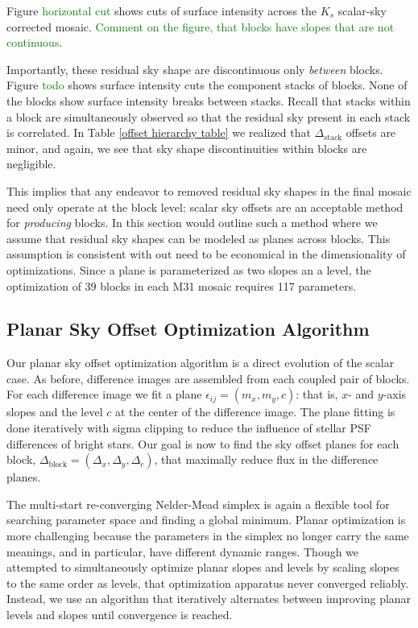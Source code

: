\documentclass[iop]{emulateapj}
\newcommand{\todo}[1]{\textcolor{green}{#1}}
\begin{document}
Figure \todo{horizontal cut} shows cuts of surface intensity across the $K_s$ scalar-sky corrected mosaic. \todo{Comment on the figure, that blocks have slopes that are not continuous}.

Importantly, these residual sky shape are discontinuous only \emph{between} blocks. Figure \todo{todo} shows surface intensity cuts the component stacks of blocks. None of the blocks show surface intensity breaks between stacks. Recall that stacks within a block are simultaneously observed so that the residual sky present in each stack is correlated. In Table \ref{offset hierarchy table} we realized that $\Delta_\mathrm{stack}$ offsets are minor, and again, we see that sky shape discontinuities within blocks are negligible.

This implies that any endeavor to removed residual sky shapes in the final mosaic need only operate at the block level: scalar sky offsets are an acceptable method for \emph{producing} blocks. In this section would outline such a method where we assume that residual sky shapes can be modeled as planes across blocks. This assumption is consistent with out need to be economical in the dimensionality of optimizations. Since a plane is parameterized as two slopes an a level, the optimization of 39 blocks in each M31 mosaic requires 117 parameters.

\subsection{Planar Sky Offset Optimization Algorithm}

Our planar sky offset optimization algorithm is a direct evolution of the scalar case. As before, difference images are assembled from each coupled pair of blocks. For each difference image we fit a plane $\epsilon_{ij} = (m_x, m_y, c)$: that is, $x$- and $y$-axis slopes and the level $c$ at the center of the difference image. The plane fitting is done iteratively with sigma clipping to reduce the influence of stellar PSF differences of bright stars. Our goal is now to find the sky offset planes for each block, $\Delta_\mathrm{block} = (\Delta_x, \Delta_y, \Delta_c)$, that maximally reduce flux in the difference planes.

The multi-start re-converging Nelder-Mead simplex is again a flexible tool for searching parameter space and finding a global minimum. Planar optimization is more challenging because the parameters in the simplex no longer carry the same meanings, and in particular, have different dynamic ranges. Though we attempted to simultaneously optimize planar slopes and levels by scaling slopes to the same order as levels, that optimization apparatus never converged reliably. Instead, we use an algorithm that iteratively alternates between improving planar levels and slopes until convergence is reached.
\end{document}
